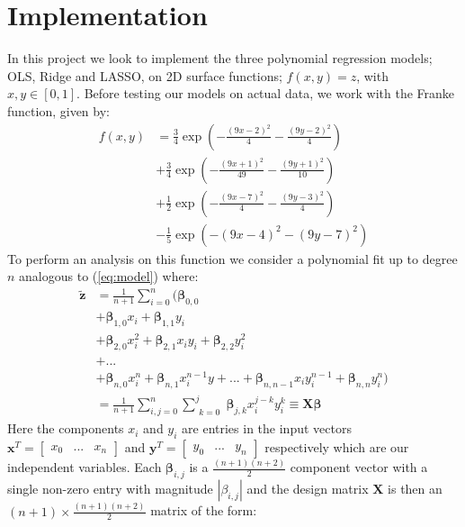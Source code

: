 \documentclass[%
reprint,
amsmath,amssymb,
aps,
pra,
]{revtex4-2}
\newcommand{\f}[2]{\frac{#1}{#2}}
\begin{document}
\section{Implementation}
In this project we look to implement the three polynomial regression models; OLS, Ridge and  LASSO, on 2D surface functions; \(f(x,y)=z\), with \(x,y\in[0,1]\). Before testing our models on actual data, we work with the Franke function, given by:
\begin{align}
	f(x,y)&=\frac{3}{4}\exp(-\frac{(9x-2)^2}{4}-\frac{(9y-2)^2}{4})\nonumber\\
	&+\frac{3}{4}\exp(-\frac{(9x+1)^2}{49}-\frac{(9y+1)^2}{10})\nonumber\\
	&+\frac{1}{2}\exp(-\frac{(9x-7)^2}{4}-\frac{(9y-3)^2}{4})\nonumber\\
	&-\frac{1}{5}\exp(-(9x-4)^2-(9y-7)^2)
\end{align}
To perform an analysis on this function we consider a polynomial fit up to degree $n$ analogous to (\ref{eq:model}) where:
\begin{align}
	\tilde{\bm{z}}&=\f1{n+1}\sum_{i=0}^{n}\bigg(\bm\beta_{0,0}\nonumber\\
	&+\bm\beta_{1,0}x_i+\bm\beta_{1,1}y_i\nonumber\\
	&+\bm\beta_{2,0}x_i^2+\bm\beta_{2,1}x_iy_i+\bm\beta_{2,2}y_i^2\nonumber\\
	&+...\nonumber\\
	&+\bm\beta_{n,0}x_i^n+\bm\beta_{n,1}x_i^{n-1}y+...+\bm\beta_{n,n-1}x_iy_i^{n-1}+\bm\beta_{n,n}y_i^n\bigg)\nonumber\\
	&=\frac{1}{n+1}\sum_{i,j=0}^{n}\sum_{\substack{k=0}}^{j}\bm\beta_{j,k} x^{j-k}_i y^{k}_i\equiv \bm X\bm\beta\label{eq:bmz}
\end{align}
Here the components $x_i$ and $y_i$ are entries in the input vectors $\bm x^T=\begin{bmatrix} x_0&...&x_n \end{bmatrix}$ and $\bm y^T=\begin{bmatrix} y_0& ...&y_n \end{bmatrix}$ respectively which are our independent variables. Each $\bm\beta_{i,j}$ is a $\frac{(n+1)(n+2)}{2}$ component vector with a single non-zero entry with magnitude $|\beta_{i,j}|$ and the design matrix $\bm X$ is then an $(n+1)\times\frac{(n+1)(n+2)}{2}$ matrix of the form:
\end{document}

